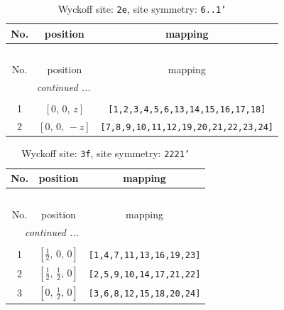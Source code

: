 \documentclass[fleqn,8pt]{jsarticle}
\begin{document}
\begin{longtable}{ccc}
\caption{Wyckoff site: {\tt 2e}, site symmetry: {\tt 6..1'}}
 \\
 \hline \hline
No. & position & mapping \\ \hline \endfirsthead

\multicolumn{2}{l}{\tablename\ \thetable{}} \\
 \hline \hline
No. & position & mapping \\ \hline \endhead

 \hline \hline
\multicolumn{2}{r}{\footnotesize\it continued ...} \\ \endfoot

 \hline \hline
\multicolumn{2}{r}{} \\ \endlastfoot

1 & $\left[ 0,\, 0,\, z \right]$ & {\tt [1,2,3,4,5,6,13,14,15,16,17,18]} \\ \hline
2 & $\left[ 0,\, 0,\, - z \right]$ & {\tt [7,8,9,10,11,12,19,20,21,22,23,24]} \\
\end{longtable}
\renewcommand{\arraystretch}{1.2}
\begin{longtable}{ccc}
\caption{Wyckoff site: {\tt 3f}, site symmetry: {\tt 2221'}}
 \\
 \hline \hline
No. & position & mapping \\ \hline \endfirsthead

\multicolumn{2}{l}{\tablename\ \thetable{}} \\
 \hline \hline
No. & position & mapping \\ \hline \endhead

 \hline \hline
\multicolumn{2}{r}{\footnotesize\it continued ...} \\ \endfoot

 \hline \hline
\multicolumn{2}{r}{} \\ \endlastfoot

1 & $\left[ \frac{1}{2},\, 0,\, 0 \right]$ & {\tt [1,4,7,11,13,16,19,23]} \\ \hline
2 & $\left[ \frac{1}{2},\, \frac{1}{2},\, 0 \right]$ & {\tt [2,5,9,10,14,17,21,22]} \\ \hline
3 & $\left[ 0,\, \frac{1}{2},\, 0 \right]$ & {\tt [3,6,8,12,15,18,20,24]} \\
\end{longtable}
\renewcommand{\arraystretch}{1.2}
\end{document}
